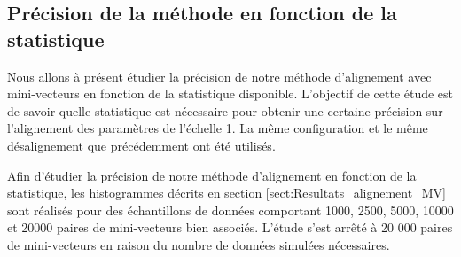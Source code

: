   \subsection{Pr\'ecision de la m\'ethode en fonction de la statistique}
  \label{sect:results_vs_stat}
  
  Nous allons \`a pr\'esent \'etudier la pr\'ecision de notre m\'ethode d'alignement avec mini-vecteurs en fonction de la statistique disponible. L'objectif de cette \'etude est de savoir quelle statistique est n\'ecessaire pour obtenir une certaine pr\'ecision sur l'alignement des param\`etres de l'\'echelle 1. La m\^eme configuration et le m\^eme d\'esalignement que pr\'ec\'edemment ont \'et\'e utilis\'es. 
  
%   
%   
%   
%   
  \medskip
  
  Afin d'\'etudier la pr\'ecision de notre m\'ethode d'alignement en fonction de la statistique, les histogrammes d\'ecrits en section \ref{sect:Resultats_alignement_MV} sont r\'ealis\'es pour des \'echantillons de donn\'ees comportant 1000, 2500, 5000, 10000 et 20000 paires de mini-vecteurs bien associ\'es. L'\'etude s'est arr\^eté \`a 20 000 paires de mini-vecteurs en raison du nombre de donn\'ees simul\'ees n\'ecessaires.
  
  \medskip
  
%   
%   

